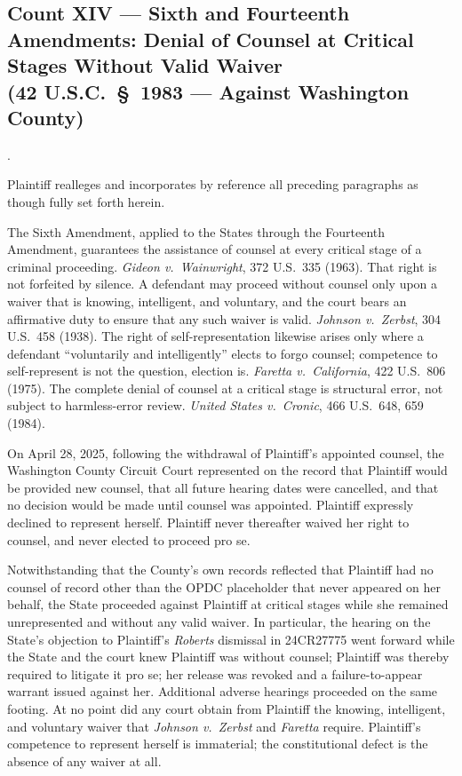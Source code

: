\documentclass[12pt,letterpaper]{article}
\newcounter{complaintpara}
\newenvironment{paras}{%
	\begin{list}{\arabic{complaintpara}.}{%
			\setlength{\leftmargin}{0.5in}%
			\setlength{\labelwidth}{0.4in}%
			\setlength{\labelsep}{0.1in}%
			\setlength{\itemsep}{0pt}%
			\setlength{\parsep}{0pt}%
			\setlength{\topsep}{6pt}%
		}%
	}{%
	\end{list}%
}
\begin{document}
	\subsection*{Count XIV --- Sixth and Fourteenth Amendments: Denial of Counsel at Critical Stages Without Valid Waiver\\
		(42 U.S.C.\ \S\ 1983 --- Against Washington County)}
	\begin{paras}
		
		\item Plaintiff realleges and incorporates by reference all preceding paragraphs as though fully set forth herein.
		
		\item The Sixth Amendment, applied to the States through the Fourteenth Amendment, guarantees the assistance of counsel at every critical stage of a criminal proceeding. \textit{Gideon v.\ Wainwright}, 372 U.S.\ 335 (1963). That right is not forfeited by silence. A defendant may proceed without counsel only upon a waiver that is knowing, intelligent, and voluntary, and the court bears an affirmative duty to ensure that any such waiver is valid. \textit{Johnson v.\ Zerbst}, 304 U.S.\ 458 (1938). The right of self-representation likewise arises only where a defendant ``voluntarily and intelligently'' elects to forgo counsel; competence to self-represent is not the question, election is. \textit{Faretta v.\ California}, 422 U.S.\ 806 (1975). The complete denial of counsel at a critical stage is structural error, not subject to harmless-error review. \textit{United States v.\ Cronic}, 466 U.S.\ 648, 659 (1984).
		
		\item On April 28, 2025, following the withdrawal of Plaintiff's appointed counsel, the Washington County Circuit Court represented on the record that Plaintiff would be provided new counsel, that all future hearing dates were cancelled, and that no decision would be made until counsel was appointed. Plaintiff expressly declined to represent herself. Plaintiff never thereafter waived her right to counsel, and never elected to proceed pro se.
		
		\item Notwithstanding that the County's own records reflected that Plaintiff had no counsel of record other than the OPDC placeholder that never appeared on her behalf, the State proceeded against Plaintiff at critical stages while she remained unrepresented and without any valid waiver. In particular, the hearing on the State's objection to Plaintiff's \textit{Roberts} dismissal in 24CR27775 went forward while the State and the court knew Plaintiff was without counsel; Plaintiff was thereby required to litigate it pro se; her release was revoked and a failure-to-appear warrant issued against her. Additional adverse hearings proceeded on the same footing. At no point did any court obtain from Plaintiff the knowing, intelligent, and voluntary waiver that \textit{Johnson v.\ Zerbst} and \textit{Faretta} require. Plaintiff's competence to represent herself is immaterial; the constitutional defect is the absence of any waiver at all.
		

\end{paras}
\end{document}
